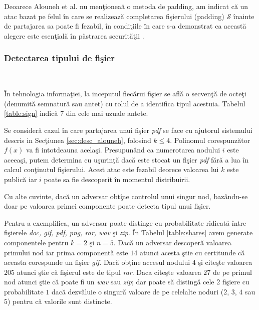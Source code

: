 \documentclass{llncs}
\begin{document}
Deoarece Alouneh et al. nu men\c{t}ionea\u{a} o metoda de padding, am indicat c\u{a} un atac bazat pe felul \^{i}n care se realizeaz\u{a} completarea fi\c{s}ierului (padding) $\mathcal{S}$ \^{i}nainte de partajarea sa poate fi fezabil, \^{i}n condi\c{t}iile \^{i}n care s-a demonstrat ca aceast\u{a} alegere este esen\c{t}ial\u{a} \^{i}n p\u{a}strarea securit\u{a}\c{t}ii \cite{Vaudenay:2002}.

\subsubsection{Detectarea tipului de fi\c{s}ier}\hspace*{\fill} \\
\label{subsec:file_type_detection}

\^{I}n tehnologia informa\c{t}iei, la inceputul fiec\u{a}rui fi\c{s}ier se afl\u{a} o secven\c{t}\u{a} de octe\c{t}i (denumit\u{a} semnatur\u{a} sau antet) cu rolul de a identifica tipul acestuia. Tabelul {\ref{table:sign}} indic\u{a} $7$ din cele mai uzuale antete.

Se consider\u{a} cazul \^{i}n care partajarea unui fi\c{s}ier \textit{pdf} se face cu ajutorul sistemului descris in {S}ec\c{t}iunea \ref{sec:desc_alouneh}, folosind $k \leq 4$. Polinomul corespunz\u{a}tor $f(x)$ va fi intotdeauna acela\c{s}i. Presupun\^{a}nd ca numerotarea nodului $i$ este aceea\c{s}i, putem determina cu u\c{s}urin\c{t}\u{a} dac\u{a} este stocat un fi\c{s}ier \textit{pdf} f\u{a}r\u{a} a lua \^{i}n calcul con\c{t}inutul fi\c{s}ierului.
Acest atac este fezabil deorece valoarea lui $k$ este public\u{a} iar $i$ poate sa fie descoperit \^{i}n momentul distribuirii.

Cu alte cuvinte, dac\u{a} un adversar obt\c{i}ne controlul unui singur nod, baz\^{a}ndu-se doar pe valoarea primei componente poate detecta tipul unui fi\c{s}ier.

Pentru a exemplifica, un adversar poate distinge cu probabilitate ridicat\u{a} \^{i}ntre fi\c{s}ierele \textit{doc, gif, pdf, png, rar, wav} \c{s}i \textit{zip}. \^{I}n Tabelul {\ref{table:shares}} avem generate componentele pentru $k = 2$ \c{s}i $n = 5$.
Dac\u{a} un adversar descoper\u{a} valoarea primului nod iar prima component\u{a} este $14$ atunci acesta \c{s}tie cu certitunde c\u{a} aceasta corespunde un fi\c{s}ier \textit{gif}. Dac\u{a} ob\c{t}ine accesul nodului $4$ \c{s}i cite\c{s}te valoarea $205$ atunci \c{s}tie c\u{a} fi\c{s}ierul este de tipul \textit{rar}. Daca cite\c{s}te valoarea $27$ de pe primul nod atunci \c{s}tie c\u{a} poate fi un \textit{wav} sau \textit{zip}; dar poate s\u{a} disting\u{a} cele 2 fi\c{s}iere cu probabilitate $1$ dac\u{a} dezv\u{a}luie o singur\u{a} valoare de pe celelalte noduri ($2$, $3$, $4$ sau $5$) pentru c\u{a} valorile sunt distincte.
\end{document}
